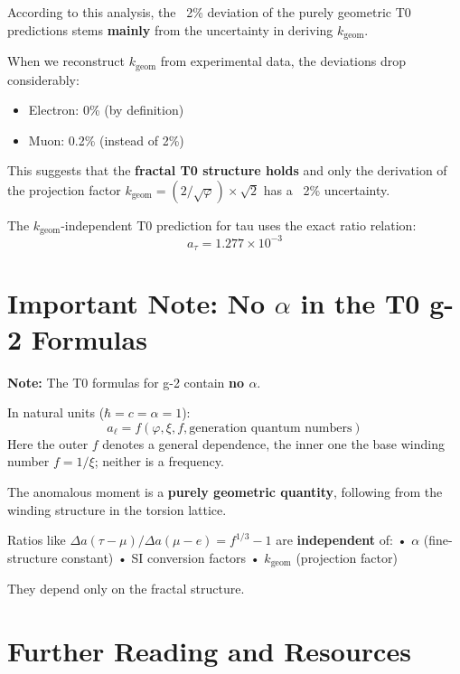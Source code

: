 	\begin{keypoint}
		According to this analysis, the ~2\% deviation of the purely geometric T0 predictions stems \textbf{mainly} from the uncertainty in deriving $k_{\text{geom}}$.
		
		When we reconstruct $k_{\text{geom}}$ from experimental data, the deviations drop considerably:
		\begin{itemize}
			\item Electron: 0\% (by definition)
			\item Muon: 0.2\% (instead of 2\%)
		\end{itemize}
		
		This suggests that the \textbf{fractal T0 structure holds} and only the derivation of the projection factor $k_{\text{geom}} = (2/\sqrt{\varphi}) \times \sqrt{2}$ has a ~2\% uncertainty.
		
		The $k_{\text{geom}}$-independent T0 prediction for tau uses the exact ratio relation:
		\begin{equation}
			\boxed{a_\tau = 1.277 \times 10^{-3}}
		\end{equation}
	\end{keypoint}
	
	\section{Important Note: No $\alpha$ in the T0 g-2 Formulas}
	
	\textbf{Note:}
	The T0 formulas for g-2 contain \textbf{no $\alpha$}.
	
	In natural units ($\hbar = c = \alpha = 1$):
	\[ a_\ell = f(\varphi, \xi, f, \text{generation quantum numbers}) \]
	Here the outer $f$ denotes a general dependence, the inner one the base winding number $f = 1/\xi$; neither is a frequency.
	
	The anomalous moment is a \textbf{purely geometric quantity},
	following from the winding structure in the torsion lattice.
	
	Ratios like $\Delta a(\tau-\mu)/\Delta a(\mu-e) = f^{1/3} - 1$ are
	\textbf{independent} of:
	• $\alpha$ (fine-structure constant)
	• SI conversion factors
	• $k_{\text{geom}}$ (projection factor)
	
	They depend only on the fractal structure.
	
	\section*{Further Reading and Resources}
	
